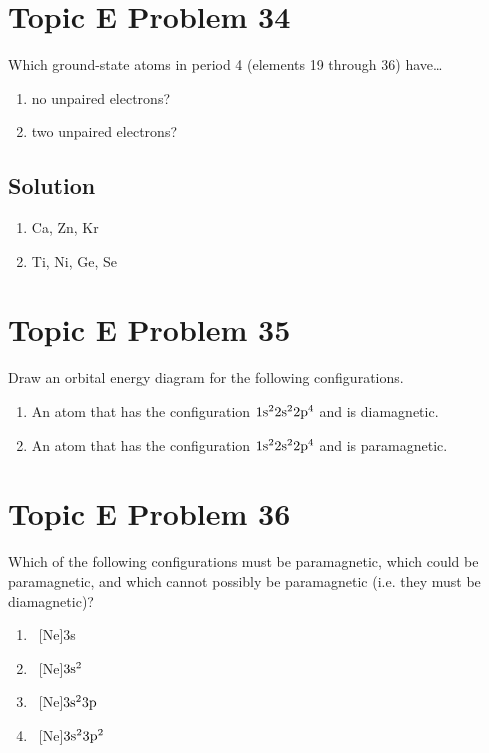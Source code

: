 \documentclass[10pt]{article}
\begin{document}
    \pagebreak
    \section{Topic E Problem 34}
        Which ground-state atoms in period 4 (elements 19 through 36) have…
        \begin{enumerate}[label=\alph*)]
            \item   no unpaired electrons?
            \item   two unpaired electrons?
        \end{enumerate}

        \subsection{Solution}
            \begin{enumerate}[label=\alph*/]
                \item   Ca, Zn, Kr
                \item   Ti, Ni, Ge, Se
            \end{enumerate}


    \pagebreak
    \section{Topic E Problem 35}
        Draw an orbital energy diagram for the following configurations.
        \begin{enumerate}
            \item   An atom that has the configuration $\rm 1s^2 2s^2 2p^4$ and is diamagnetic.
            \item   An atom that has the configuration $\rm 1s^2 2s^2 2p^4$ and is paramagnetic.
        \end{enumerate}

    \pagebreak
    \section{Topic E Problem 36}
        Which of the following configurations must be paramagnetic, which could be paramagnetic, and which cannot possibly be paramagnetic (i.e. they must be diamagnetic)?
        \begin{multicols}{2}
            \begin{enumerate}[label=\alph*)]
                \item   \ [Ne]3s
                \item   \ [Ne]$\rm 3s^2$
                \item   \ [Ne]$\rm 3s^2 3p$
                \item   \ [Ne]$\rm 3s^2 3p^2$
            \end{enumerate}
        \end{multicols}
\end{document}
